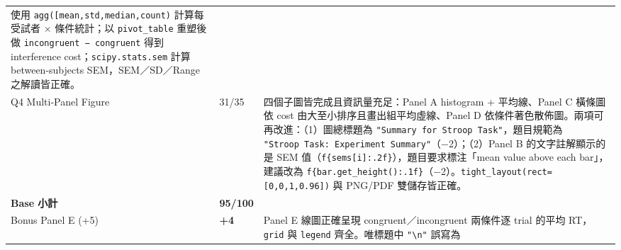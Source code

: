 \documentclass[
  14pt,
]{extarticle}
\begin{document}
\begin{longtable}[]{@{}lll@{}}
\begin{minipage}[t]{0.77\columnwidth}
使用
\texttt{agg({[}\textquotesingle{}mean\textquotesingle{},\textquotesingle{}std\textquotesingle{},\textquotesingle{}median\textquotesingle{},\textquotesingle{}count\textquotesingle{}{]})}
計算每受試者 × 條件統計；以 \texttt{pivot\_table} 重塑後做
\texttt{incongruent\ −\ congruent} 得到 interference
cost；\texttt{scipy.stats.sem} 計算 between-subjects SEM，SEM／SD／Range
之解讀皆正確。\strut
\end{minipage}\tabularnewline
\begin{minipage}[t]{0.10\columnwidth}\raggedright
Q4 Multi-Panel Figure\strut
\end{minipage} & \begin{minipage}[t]{0.04\columnwidth}\raggedright
31/35\strut
\end{minipage} & \begin{minipage}[t]{0.77\columnwidth}\raggedright
四個子圖皆完成且資訊量充足：Panel A histogram + 平均線、Panel C 橫條圖依
cost 由大至小排序且畫出組平均虛線、Panel D
依條件著色散佈圖。兩項可再改進：（1）圖總標題為
\texttt{"Summary\ for\ Stroop\ Task"}，題目規範為
\texttt{"Stroop\ Task:\ Experiment\ Summary"}（−2）；（2）Panel B
的文字註解顯示的是 SEM
值（\texttt{f\textquotesingle{}\{sems{[}i{]}:.2f\}\textquotesingle{}}），題目要求標注「mean
value above each bar」，建議改為
\texttt{f\textquotesingle{}\{bar.get\_height():.1f\}\textquotesingle{}}（−2）。\texttt{tight\_layout(rect={[}0,0,1,0.96{]})}
與 PNG/PDF 雙儲存皆正確。\strut
\end{minipage}\tabularnewline
\begin{minipage}[t]{0.10\columnwidth}\raggedright
\textbf{Base 小計}\strut
\end{minipage} & \begin{minipage}[t]{0.04\columnwidth}\raggedright
\textbf{95/100}\strut
\end{minipage} & \begin{minipage}[t]{0.77\columnwidth}\raggedright
\strut
\end{minipage}\tabularnewline
\begin{minipage}[t]{0.10\columnwidth}\raggedright
Bonus Panel E (+5)\strut
\end{minipage} & \begin{minipage}[t]{0.04\columnwidth}\raggedright
\textbf{+4}\strut
\end{minipage} & \begin{minipage}[t]{0.77\columnwidth}\raggedright
Panel E 線圖正確呈現 congruent／incongruent 兩條件逐 trial 的平均
RT，\texttt{grid} 與 \texttt{legend} 齊全。唯標題中
\texttt{"\textbackslash{}n"} 誤寫為

\end{minipage}
\end{longtable}
\end{document}
